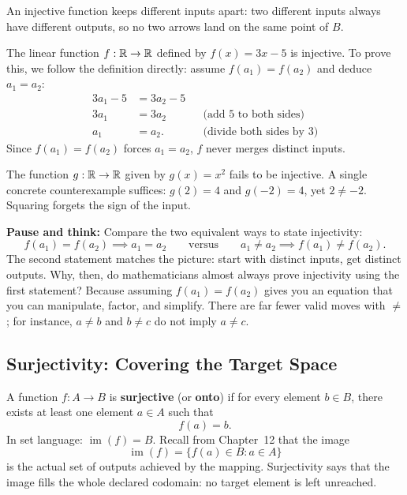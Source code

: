 An injective function keeps different inputs apart: two different inputs always have different outputs, so no two arrows land on the same point of $B$.

\begin{example}
The linear function $f: \mathbb{R} \to \mathbb{R}$ defined by $f(x) = 3x - 5$ is injective.
To prove this, we follow the definition directly: assume $f(a_1) = f(a_2)$ and deduce $a_1 = a_2$:
\begin{align*}
3a_1 - 5 &= 3a_2 - 5 \\
3a_1 &= 3a_2 && \text{(add $5$ to both sides)} \\
a_1 &= a_2. && \text{(divide both sides by $3$)}
\end{align*}
Since $f(a_1) = f(a_2)$ forces $a_1 = a_2$, $f$ never merges distinct inputs.
\end{example}

\begin{example}
The function $g: \mathbb{R} \to \mathbb{R}$ given by $g(x) = x^2$ fails to be injective. A single concrete counterexample suffices: $g(2) = 4$ and $g(-2) = 4$, yet $2 \neq -2$. Squaring forgets the sign of the input.
\end{example}

\begin{recoverybox}
\textbf{Pause and think:} Compare the two equivalent ways to state injectivity:
\[
f(a_1) = f(a_2) \implies a_1 = a_2 \qquad \text{versus} \qquad a_1 \neq a_2 \implies f(a_1) \neq f(a_2).
\]
The second statement matches the picture: start with distinct inputs, get distinct outputs. Why, then, do mathematicians almost always prove injectivity using the first statement? Because assuming $f(a_1) = f(a_2)$ gives you an equation that you can manipulate, factor, and simplify. There are far fewer valid moves with $\neq$; for instance, $a \neq b$ and $b \neq c$ do not imply $a \neq c$.
\end{recoverybox}

\subsection{Surjectivity: Covering the Target Space}

\begin{definition}[Surjective]
A function $f: A \to B$ is \textbf{surjective} (or \textbf{onto}) if for every element $b \in B$, there exists at least one element $a \in A$ such that
\[
f(a) = b.
\]
In set language: $\operatorname{im}(f) = B$. Recall from Chapter~12 that the image
\[
\operatorname{im}(f) = \{f(a) \in B : a \in A\}
\]
is the actual set of outputs achieved by the mapping. Surjectivity says that the image fills the whole declared codomain: no target element is left unreached.
\end{definition}

